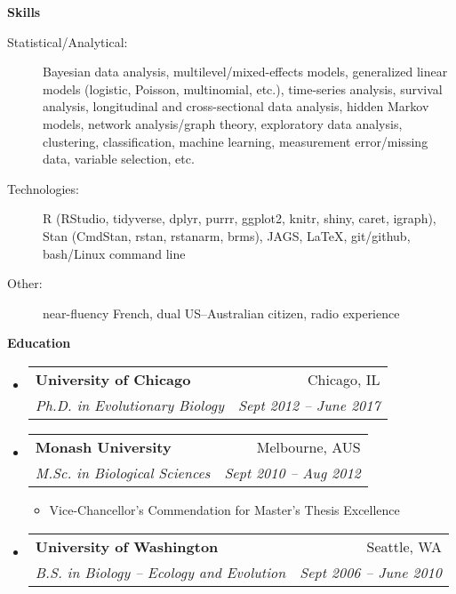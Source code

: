 \documentclass[letterpaper,11pt]{article}
\makeatletter
\newcommand{\resheading}[1]{{\large \colorbox{mygrey}{\begin{minipage}{\textwidth}{\textbf{#1 \vphantom{p\^{E}}}}\end{minipage}}}}
\newcommand{\ressubheading}[4]{
  \begin{tabular*}{6.5in}{l@{\extracolsep{\fill}}r}
    \textbf{#1} & #2 \\
    \textit{#3} & \textit{#4} \\
\end{tabular*}\vspace{-6pt}}
\makeatother
\begin{document}

%

\vspace{0.25in}
\resheading{Skills}
\begin{description}
  \item[Statistical/Analytical:] { \footnotesize Bayesian data analysis, multilevel/mixed-effects models, generalized linear models (logistic, Poisson, multinomial, etc.), time-series analysis, survival analysis, longitudinal and cross-sectional data analysis, hidden Markov models, network analysis/graph theory, exploratory data analysis, clustering, classification, machine learning, measurement error/missing data, variable selection, etc. }
  \item[Technologies:] { \footnotesize R (RStudio, tidyverse, dplyr, purrr, ggplot2, knitr, shiny, caret, igraph), Stan (CmdStan, rstan, rstanarm, brms), JAGS, \LaTeX, git/github, bash/Linux command line }
  \item[Other:] { \footnotesize near-fluency French, dual US--Australian citizen, radio experience }
\end{description} %
\vspace{0.25in}


\resheading{Education}
\begin{itemize}
  \item
    \ressubheading{University of Chicago}{Chicago, IL}{Ph.D. in Evolutionary Biology}{Sept 2012 -- June 2017}
  \item
    \ressubheading{Monash University}{Melbourne, AUS}{M.Sc. in Biological Sciences}{Sept 2010 -- Aug 2012}
    \begin{itemize}
      \item Vice-Chancellor's Commendation for Master's Thesis Excellence
    \end{itemize}
  \item
    \ressubheading{University of Washington}{Seattle, WA}{B.S. in Biology -- Ecology and Evolution}{Sept 2006 -- June 2010}
\end{itemize} %



\end{document}
